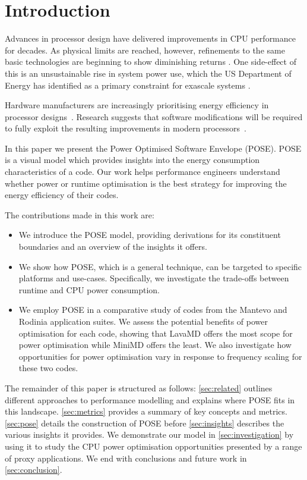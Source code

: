 \section{Introduction}
Advances in processor design have delivered improvements in CPU performance for decades. As physical limits are reached, however, refinements to the same basic technologies are beginning to show diminishing returns \cite{esmaeilzadeh:2011aa}. One side-effect of this is an unsustainable rise in system power use, which the US Department of Energy has identified as a primary constraint for exascale systems \cite{shalf:2011aa}.

Hardware manufacturers are increasingly prioritising energy efficiency in processor designs~\cite{kurd:2014aa}. 
Research suggests that software modifications will be required to fully exploit the resulting improvements in modern processors~\cite{shao:2013aa}.

In this paper we present the Power Optimised Software Envelope (POSE).
POSE is a visual model which provides insights into the energy consumption characteristics of a code.
Our work helps performance engineers understand whether power or runtime optimisation is the best strategy for improving the energy efficiency of their codes.

\medskip \noindent
The contributions made in this work are:
\begin{itemize}
  \item We introduce the POSE model, providing derivations for its constituent boundaries and an overview of the insights it offers.
  \item We show how POSE, which is a general technique, can be targeted to specific platforms and use-cases. 
        Specifically, we investigate the trade-offs between runtime and CPU power consumption.
  \item We employ POSE in a comparative study of codes from the Mantevo and Rodinia application suites. 
        We assess the potential benefits of power optimisation for each code, showing that LavaMD offers the most scope for power optimisation while MiniMD offers the least.
        We also investigate how opportunities for power optimisation vary in response to frequency scaling for these two codes.
\end{itemize}

The remainder of this paper is structured as follows: \autoref{sec:related} outlines different approaches to performance modelling and explains where POSE fits in this landscape.
\autoref{sec:metrics} provides a summary of key concepts and metrics.
\autoref{sec:pose} details the construction of POSE before \autoref{sec:insights} describes the various insights it provides.
We demonstrate our model in \autoref{sec:investigation} by using it to study the CPU power optimisation opportunities presented by a range of proxy applications. 
We end with conclusions and future work in \autoref{sec:conclusion}.
